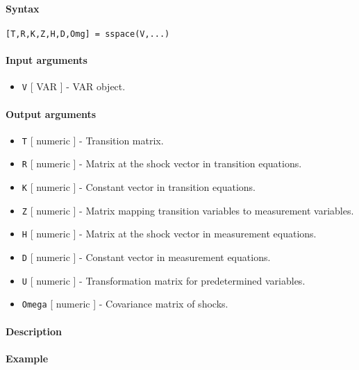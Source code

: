 


	\paragraph{Syntax}\label{syntax}

\begin{verbatim}
[T,R,K,Z,H,D,Omg] = sspace(V,...)
\end{verbatim}

\paragraph{Input arguments}\label{input-arguments}

\begin{itemize}
\itemsep1pt\parskip0pt
\item
  \texttt{V} {[} VAR {]} - VAR object.
\end{itemize}

\paragraph{Output arguments}\label{output-arguments}

\begin{itemize}
\item
  \texttt{T} {[} numeric {]} - Transition matrix.
\item
  \texttt{R} {[} numeric {]} - Matrix at the shock vector in transition
  equations.
\item
  \texttt{K} {[} numeric {]} - Constant vector in transition equations.
\item
  \texttt{Z} {[} numeric {]} - Matrix mapping transition variables to
  measurement variables.
\item
  \texttt{H} {[} numeric {]} - Matrix at the shock vector in measurement
  equations.
\item
  \texttt{D} {[} numeric {]} - Constant vector in measurement equations.
\item
  \texttt{U} {[} numeric {]} - Transformation matrix for predetermined
  variables.
\item
  \texttt{Omega} {[} numeric {]} - Covariance matrix of shocks.
\end{itemize}

\paragraph{Description}\label{description}

\paragraph{Example}\label{example}


